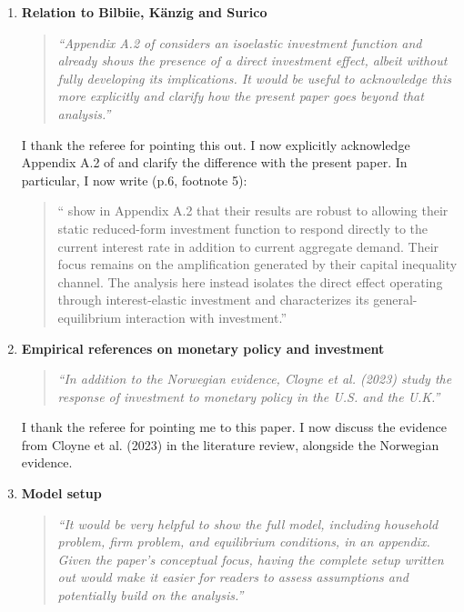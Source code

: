 \documentclass[11pt]{article}
\begin{document}
\begin{enumerate}

\item  \textbf{Relation to Bilbiie, K\"anzig and Surico}

\begin{quote}
\itshape ``Appendix A.2 of \cite{Bilbiieetal2022} considers an isoelastic investment function and already shows the presence of a direct investment effect, albeit without fully developing its implications. It would be useful to acknowledge this more explicitly and clarify how the present paper goes beyond that analysis.''
\end{quote}

I thank the referee for pointing this out. I now explicitly acknowledge Appendix A.2 of \cite{Bilbiieetal2022} and clarify the difference with the present paper. In particular, I now write (p.6, footnote 5):

\begin{quote}
``\cite{Bilbiieetal2022} show in Appendix A.2 that their results are robust to allowing their static reduced-form investment function to respond directly to the current interest rate in addition to current aggregate demand. Their focus remains on the amplification generated by their capital inequality channel. The analysis here instead isolates the direct effect operating through interest-elastic investment and characterizes its general-equilibrium interaction with investment.''
\end{quote}

\item  \textbf{Empirical references on monetary policy and investment}

\begin{quote}
\itshape ``In addition to the Norwegian evidence, Cloyne et al. (2023) study the response of investment to monetary policy in the U.S. and the U.K.''
\end{quote}

I thank the referee for pointing me to this paper. I now discuss the evidence from Cloyne et al. (2023) in the literature review, alongside the Norwegian evidence.\\

\item  \textbf{Model setup}

\begin{quote}
\itshape ``It would be very helpful to show the full model, including household problem, firm problem, and equilibrium conditions, in an appendix. Given the paper's conceptual focus, having the complete setup written out would make it easier for readers to assess assumptions and potentially build on the analysis.''
\end{quote}


\end{enumerate}
\end{document}
